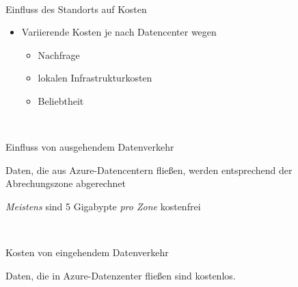 \documentclass{scrartcl}
\newenvironment{flashcard}[2][]{%
    #1
    \vfill
    \centerline{\Large{#2}}
    \vfill
\newpage
}
{\newpage}
\begin{document}
    \begin{flashcard}[\ ]{Einfluss des Standorts auf Kosten}
        \begin{itemize}
            \item Variierende Kosten je nach Datencenter wegen
            \begin{itemize}
                \item Nachfrage
                \item lokalen Infrastrukturkosten
                \item Beliebtheit
            \end{itemize}
        \end{itemize}

    \end{flashcard}

    \begin{flashcard}[\ ]{Einfluss von ausgehendem Datenverkehr}
        Daten, die aus Azure-Datencentern fließen, werden entsprechend der Abrechungszone abgerechnet

        \vspace{5mm}
        \emph{Meistens} sind 5 Gigabypte \emph{pro Zone} kostenfrei
    \end{flashcard}

    \begin{flashcard}[\ ]{Kosten von eingehendem Datenverkehr}
        Daten, die in Azure-Datenzenter fließen sind kostenlos.
    \end{flashcard}
\end{document}
